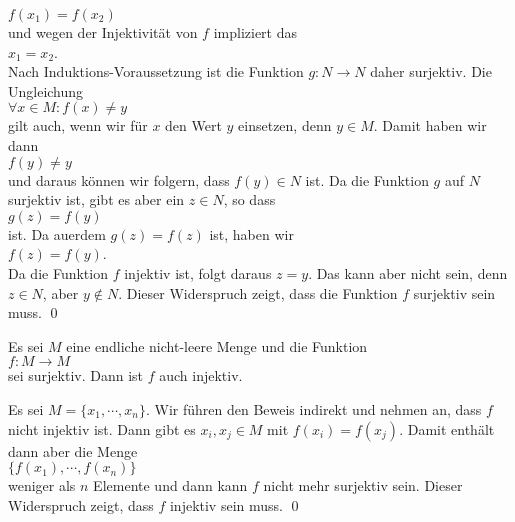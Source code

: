 \begin{enumerate}
             \hspace*{1.3cm}
             $f(x_1) = f(x_2)$
             \\[0.2cm]
             und wegen der Injektivit\"{a}t von $f$ impliziert das
             \\[0.2cm]
             \hspace*{1.3cm}
             $x_1 = x_2$.
             \\[0.2cm]
             Nach Induktions-Voraussetzung ist die Funktion $g:N \rightarrow N$ daher 
             surjektiv.  Die Ungleichung
             \\[0.2cm]
             \hspace*{1.3cm}
             $\forall x \in M: f(x) \not= y$ 
             \\[0.2cm]
             gilt auch, wenn wir f\"{u}r $x$ den Wert $y$ einsetzen, denn $y \in M$.  Damit haben wir dann
             \\[0.2cm]
             \hspace*{1.3cm}
             $f(y) \not= y$
             \\[0.2cm]
             und daraus k\"{o}nnen wir folgern, dass $f(y) \in N$ ist.  Da die Funktion $g$ auf $N$
             surjektiv ist, gibt es aber ein $z \in N$, so dass
             \\[0.2cm]
             \hspace*{1.3cm}
             $g(z) = f(y)$
             \\[0.2cm]
             ist.  Da au\3erdem $g(z) = f(z)$ ist, haben wir
             \\[0.2cm]
             \hspace*{1.3cm}
             $f(z) = f(y)$.
             \\[0.2cm]
             Da die Funktion $f$ injektiv ist, folgt daraus $z = y$.  Das kann aber nicht
             sein, denn $z \in N$, aber $y \not\in N$.  Dieser Widerspruch zeigt, dass die Funktion
             $f$ surjektiv sein muss.  \qed
\end{enumerate}

\begin{Satz}
  Es sei $M$ eine endliche nicht-leere Menge und die Funktion 
  \\[0.2cm]
  \hspace*{1.3cm}
  $f:M \rightarrow M$
  \\[0.2cm]
  sei surjektiv.  Dann ist $f$ auch injektiv.
\end{Satz}

\proof
Es sei $M = \{x_1, \cdots, x_n \}$.  Wir f\"{u}hren den Beweis indirekt und nehmen an, dass $f$ nicht injektiv
ist.  Dann gibt es $x_i, x_j \in M$ mit $f(x_i) = f(x_j)$.  Damit enth\"{a}lt dann aber die Menge
\\[0.2cm]
\hspace*{1.3cm}
$\{ f(x_1), \cdots, f(x_n) \}$
\\[0.2cm]
weniger als $n$ Elemente und dann kann $f$ nicht mehr surjektiv sein.  Dieser Widerspruch zeigt, dass $f$
injektiv sein muss.
\qed

